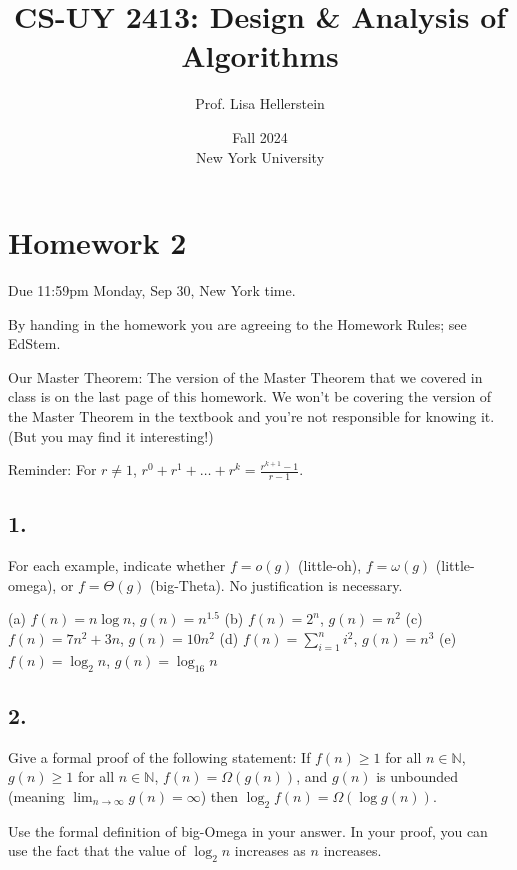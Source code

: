\documentclass{article}
\begin{document}
\title{CS-UY 2413: Design \& Analysis of Algorithms}
\author{Prof. Lisa Hellerstein}
\date{Fall 2024 \\ New York University}

\maketitle

\section*{Homework 2}
Due 11:59pm Monday, Sep 30, New York time.

By handing in the homework you are agreeing to the Homework Rules; see EdStem.

Our Master Theorem: The version of the Master Theorem that we covered in class is on the last page of this homework. We won’t be covering the version of the Master Theorem in the textbook and you’re not responsible for knowing it. (But you may find it interesting!)

Reminder: For $r \neq 1$, $r^0 + r^1 + \dots + r^k = \frac{r^{k+1} - 1}{r - 1}$.

\subsection*{1.}
For each example, indicate whether $f = o(g)$ (little-oh), $f = \omega(g)$ (little-omega), or $f = \Theta(g)$ (big-Theta). No justification is necessary.

(a) $f(n) = n \log n$, $g(n) = n^{1.5}$
(b) $f(n) = 2^n$, $g(n) = n^2$
(c) $f(n) = 7n^2 + 3n$, $g(n) = 10n^2$
(d) $f(n) = \sum_{i=1}^n i^2$, $g(n) = n^3$
(e) $f(n) = \log_2 n$, $g(n) = \log_{16} n$


\subsection*{2.}
Give a formal proof of the following statement: If $f(n) \ge 1$ for all $n \in \mathbb{N}$, $g(n) \ge 1$ for all $n \in \mathbb{N}$, $f(n) = \Omega(g(n))$, and $g(n)$ is unbounded (meaning $\lim_{n \to \infty} g(n) = \infty$) then $\log_2 f(n) = \Omega(\log g(n))$.

Use the formal definition of big-Omega in your answer. In your proof, you can use the fact that the value of $\log_2 n$ increases as $n$ increases.
\end{document}
